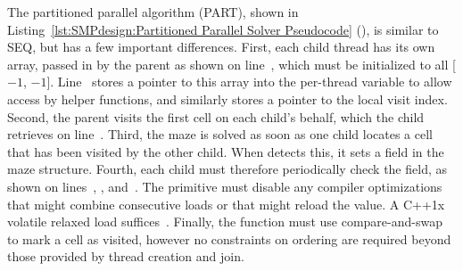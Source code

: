 \begin{fcvref}
The partitioned parallel algorithm (PART), shown in
Listing~\ref{lst:SMPdesign:Partitioned Parallel Solver Pseudocode}
(),
is similar to SEQ, but has a few important differences.
First, each child thread has its own  array, passed in by
the parent as shown on line~,
which must be initialized to all [$-1$, $-1$].
Line~ stores a pointer to this array into the per-thread variable
 to allow access by helper functions, and similarly stores
a pointer to the local visit index.
Second, the parent visits the first cell on each child's behalf,
which the child retrieves on line~.
Third, the maze is solved as soon as one child locates a cell that has
been visited by the other child.
When  detects this,
it sets a  field in the maze structure.
Fourth, each child must therefore periodically check the 
field, as shown on lines~, , and~.
The  primitive must disable any compiler
optimizations that might combine consecutive loads or that
might reload the value.
A C++1x volatile relaxed load suffices~\cite{PeteBecker2011N3242}.
Finally, the  function must use
compare-and-swap to mark a cell as visited, however
no constraints on ordering are required beyond those provided by
thread creation and join.
\end{fcvref}

\begin{listing}[tbp]
\begin{fcvlabel}
\end{fcvlabel}
\caption{Partitioned Parallel Helper Pseudocode}
\label{lst:SMPdesign:Partitioned Parallel Helper Pseudocode}
\end{listing}

